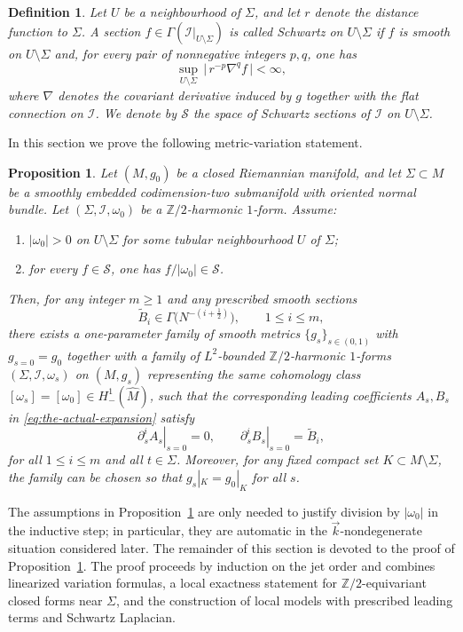\documentclass[11pt]{amsart}
\newcommand{\ZT}{\mathbb{Z}/2}
\newcommand{\pa}{\partial}
\newcommand{\Msch}{\MS}
\newcommand{\MS}{\mathcal{S}}
\newtheorem{proposition}[theorem]{Proposition}
\newtheorem{definition}[theorem]{Definition}
\begin{document}
\begin{definition}
	Let \(U\) be a neighbourhood of \(\Sigma\), and let \(r\) denote the distance function to \(\Sigma\).
	A section \(f\in \Gamma(\mathcal I|_{U\setminus\Sigma})\) is called \emph{Schwartz} on
	\(U\setminus\Sigma\) if \(f\) is smooth on \(U\setminus\Sigma\) and, for every pair of
	nonnegative integers \(p,q\), one has
	\[
	\sup_{U\setminus\Sigma}\, \bigl|\, r^{-p}\nabla^{q} f \,\bigr| < \infty,
	\]
	where \(\nabla\) denotes the covariant derivative induced by \(g\) together with the flat
	connection on \(\mathcal I\).
	We denote by \(\Msch\) the space of Schwartz sections of \(\mathcal I\) on \(U\setminus\Sigma\).
\end{definition}
In this section we prove the following metric-variation statement.

\begin{proposition}\label{prop:main-result-linear-theory}
	Let $(M,g_0)$ be a closed Riemannian manifold, and let $\Sigma\subset M$ be a smoothly embedded
	codimension-two submanifold with oriented normal bundle. Let $(\Sigma,\mathcal I,\omega_0)$ be a
	$\ZT$-harmonic $1$-form. Assume:
	\begin{enumerate}
		\item[(i)] $|\omega_0|>0$ on $U\setminus\Sigma$ for some tubular neighbourhood $U$ of $\Sigma$;
		\item[(ii)] for every $f\in\Msch$, one has $f/|\omega_0|\in \Msch$.
	\end{enumerate}
	Then, for any integer $m\ge 1$ and any prescribed smooth sections
	\[
	\tilde B_i \in \Gamma\!\bigl(N^{-(i+\frac12)}\bigr), \qquad 1\le i\le m,
	\]
	there exists a one-parameter family of smooth metrics $\{g_s\}_{s\in(0,1)}$ with $g_{s=0}=g_0$
	together with a family of $L^2$-bounded $\ZT$-harmonic $1$-forms $(\Sigma,\mathcal I,\omega_s)$ on
	$(M,g_s)$ representing the same cohomology class $[\omega_s]=[\omega_0]\in H^1_-(\hat M)$, such that
	the corresponding leading coefficients $A_s,B_s$ in \eqref{eq:the-actual-expansion} satisfy
	\begin{equation}
		\label{eq_variationABterms}
		\left.\pa_s^i A_s\right|_{s=0}=0,
		\qquad
		\left.\pa_s^i B_s\right|_{s=0}=\tilde B_i,
	\end{equation}
	for all $1\le i\le m$ and all $t\in\Sigma$. Moreover, for any fixed compact set $K\subset M\setminus
	\Sigma$, the family can be chosen so that $g_s|_K=g_0|_K$ for all $s$.
\end{proposition}

The assumptions in Proposition~\ref{prop:main-result-linear-theory} are only needed to justify
division by $|\omega_0|$ in the inductive step; in particular, they are automatic in the
$\vec{k}$-nondegenerate situation considered later. The remainder of this section is devoted to
the proof of Proposition~\ref{prop:main-result-linear-theory}. The proof proceeds by induction on
the jet order and combines linearized variation formulas, a local exactness statement for
$\ZT$-equivariant closed forms near $\Sigma$, and the construction of local models with prescribed
leading terms and Schwartz Laplacian.
\end{document}

